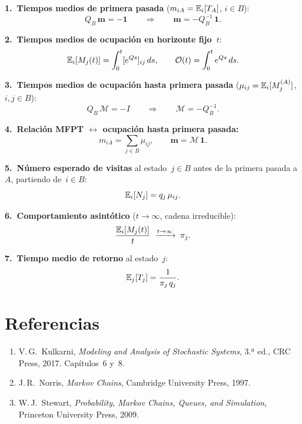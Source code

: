 \documentclass[11pt, letterpaper]{article}
\begin{document}
\begin{metodobox}

\textbf{1.\ Tiempos medios de primera pasada} ($m_{iA}=\mathbb{E}_i[T_A]$,
  $i\in B$):
  \[
    Q_B\,\mathbf{m} = -\mathbf{1}
    \qquad\Longrightarrow\qquad
    \mathbf{m} = -Q_B^{-1}\,\mathbf{1}.
  \]

\textbf{2.\ Tiempos medios de ocupación en horizonte fijo~$t$}:
  \[
    \mathbb{E}_i[M_j(t)] = \int_0^t [e^{Qs}]_{ij}\,ds,
    \qquad
    \mathcal{O}(t) = \int_0^t e^{Qs}\,ds.
  \]

\textbf{3.\ Tiempos medios de ocupación hasta primera pasada}
  ($\mu_{ij}=\mathbb{E}_i[M_j^{(A)}]$, $i,j\in B$):
  \[
    Q_B\,\mathcal{M} = -I
    \qquad\Longrightarrow\qquad
    \mathcal{M} = -Q_B^{-1}.
  \]

\textbf{4.\ Relación MFPT $\leftrightarrow$ ocupación hasta primera
  pasada:}
  \[
    m_{iA} = \sum_{j\in B}\mu_{ij}, \qquad
    \mathbf{m} = \mathcal{M}\,\mathbf{1}.
  \]

\textbf{5.\ Número esperado de visitas} al estado~$j\in B$ antes de
  la primera pasada a~$A$, partiendo de~$i\in B$:
  \[
    \mathbb{E}_i[N_j] = q_j\,\mu_{ij}.
  \]

\textbf{6.\ Comportamiento asintótico} ($t\to\infty$, cadena
  irreducible):
  \[
    \frac{\mathbb{E}_i[M_j(t)]}{t}\;\xrightarrow{t\to\infty}\;\pi_j.
  \]

\textbf{7.\ Tiempo medio de retorno} al estado~$j$:
  \[
    \mathbb{E}_j[T_j] = \frac{1}{\pi_j\,q_j}.
  \]

\end{metodobox}

\section*{Referencias}

\begin{enumerate}
  \item V.\,G.\ Kulkarni, \textit{Modeling and Analysis of Stochastic
    Systems}, 3.ª ed., CRC Press, 2017.  Capítulos~6 y~8.
  \item J.\,R.\ Norris, \textit{Markov Chains}, Cambridge University
    Press, 1997.
  \item W.\,J.\ Stewart, \textit{Probability, Markov Chains, Queues,
    and Simulation}, Princeton University Press, 2009.
\end{enumerate}
\end{document}
